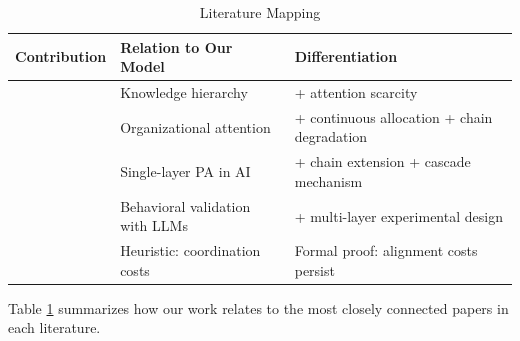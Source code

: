 \begin{table}[htbp]
\centering
\small
\setlength{\tabcolsep}{5pt}
\caption{Literature Mapping}
\label{tab:literature}
\begin{tabular}{@{}>{\raggedright\arraybackslash}p{3.0cm}>{\raggedright\arraybackslash}p{3.6cm}>{\raggedright\arraybackslash}p{3.8cm}@{}}
\toprule
\textbf{Contribution} & \textbf{Relation to Our Model} & \textbf{Differentiation} \\
\midrule
\citet{garicano2000hierarchies} & Knowledge hierarchy & + attention scarcity \\
\citet{dessein2006adaptive} & Organizational attention & + continuous allocation + chain degradation \\
\citet{hadfield2021principal} & Single-layer PA in AI & + chain extension + cascade mechanism \\
\citet{phelps2023models} & Behavioral validation with LLMs & + multi-layer experimental design \\
\citet{yang2025ten} & Heuristic: coordination costs & Formal proof: alignment costs persist \\
\bottomrule
\end{tabular}
\end{table}

Table \ref{tab:literature} summarizes how our work relates to the most closely connected papers in each literature.
